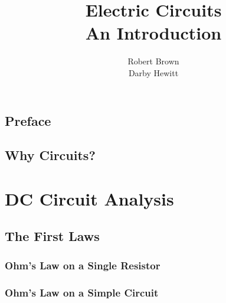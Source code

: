 \documentclass[a4paper,11pt]{book}
\title{\Huge \textbf{Electric Circuits}  \\ \huge An Introduction}
\author{Robert Brown \\ Darby Hewitt}
\newenvironment{dedication}
{
   \cleardoublepage
   \thispagestyle{empty}
   \vspace*{\stretch{1}}
   \hfill\begin{minipage}[t]{0.66\textwidth}
   \raggedright
}
{
   \end{minipage}
   \vspace*{\stretch{3}}
   \clearpage
}
\begin{document}
\frontmatter
\maketitle


\tableofcontents

\mainmatter


\chapter*{Preface}


\chapter{Why Circuits?}

\part{DC Circuit Analysis}

\chapter{The First Laws}

\section{Ohm's Law on a Single Resistor}

\section{Ohm's Law on a Simple Circuit} \label{sec:FL_simpleCircuit}
\end{document}
